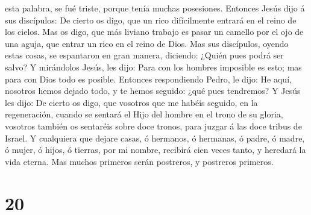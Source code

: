 esta palabra, se fué triste, porque tenía muchas posesiones.
 Entonces Jesús dijo á sus discípulos: De cierto os digo,
que un rico difícilmente entrará en el reino de los cielos.
 Mas os digo, que más liviano trabajo es pasar un camello
por el ojo de una aguja, que entrar un rico en el reino de Dios.
 Mas sus discípulos, oyendo estas cosas, se espantaron en
gran manera, diciendo: ¿Quién pues podrá ser salvo?  Y
mirándolos Jesús, les dijo: Para con los hombres imposible es esto; mas
para con Dios todo es posible.  Entonces respondiendo
Pedro, le dijo: He aquí, nosotros hemos dejado todo, y te hemos seguido:
¿qué pues tendremos?  Y Jesús les dijo: De cierto os
digo, que vosotros que me habéis seguido, en la regeneración, cuando se
sentará el Hijo del hombre en el trono de su gloria, vosotros también os
sentaréis sobre doce tronos, para juzgar á las doce tribus de Israel.
 Y cualquiera que dejare casas, ó hermanos, ó hermanas, ó
padre, ó madre, ó mujer, ó hijos, ó tierras, por mi nombre, recibirá
cien veces tanto, y heredará la vida eterna.  Mas muchos
primeros serán postreros, y postreros primeros.

\hypertarget{section-19}{%
\section{20}\label{section-19}}

